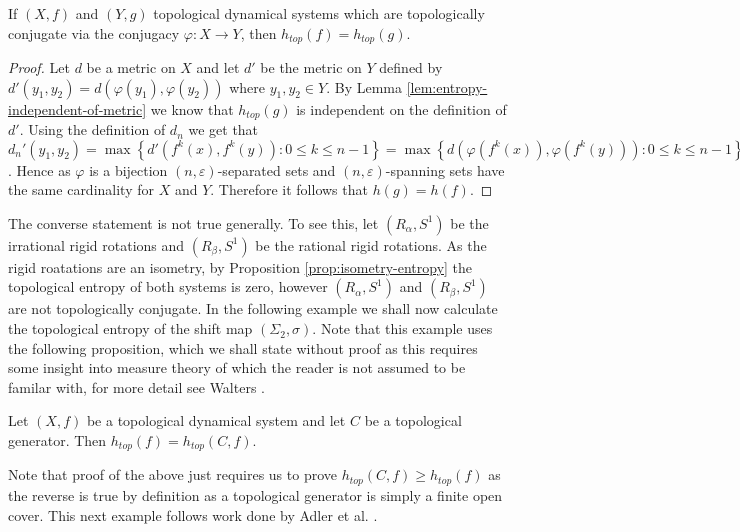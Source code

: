 \begin{prop} \label{prop:conjugacy-preserves-entropy}
    If $(X, f)$ and $(Y, g)$ topological dynamical systems which are topologically conjugate via the conjugacy $\varphi: X \to Y$, then $h_{top}(f) = h_{top}(g)$.
    \begin{proof}
    Let $d$ be a metric on $X$ and let $d'$ be the metric on $Y$ defined by $d'(y_1, y_2) = d(\varphi(y_1), \varphi(y_2))$ where $y_1, y_2 \in Y$. By Lemma \ref{lem:entropy-independent-of-metric} we know that $h_{top}(g)$ is independent on the definition of $d'$. Using the definition of $d_n$ we get that $d_n'(y_1, y_2) = \max{\left\lbrace d'(f^k(x), f^k(y)): 0 \leq k \leq n - 1 \right\rbrace} = \max{\left\lbrace d(\varphi(f^k(x)), \varphi(f^k(y))): 0 \leq k \leq n - 1 \right\rbrace} = \max{\left\lbrace d(f^k(\varphi(x)), f^k(\varphi(y))): 0 \leq k \leq n - 1 \right\rbrace}  = d_n(\varphi(y_1), \varphi(y_2))$. Hence as $\varphi$ is a bijection $(n, \varepsilon)$-separated sets and $(n, \varepsilon)$-spanning sets have the same cardinality for $X$ and $Y$. Therefore it follows that $h(g) = h(f)$.
    \end{proof}
\end{prop}

The converse statement is not true generally. To see this, let $(R_\alpha, S^1)$ be the irrational rigid rotations and $(R_\beta, S^1)$ be the rational rigid rotations. As the rigid roatations are an isometry, by Proposition \ref{prop:isometry-entropy} the topological entropy of both systems is zero, however $(R_\alpha, S^1)$ and $(R_\beta, S^1)$ are not topologically conjugate. In the following example we shall now calculate the topological entropy of the shift map $(\Sigma_2, \sigma)$. Note that this example uses the following proposition, which we shall state without proof as this requires some insight into measure theory of which the reader is not assumed to be familar with, for more detail see Walters \cite{walters}.

\begin{prop} \label{prop:entropy-generator}
    Let $(X, f)$ be a topological dynamical system and let $C$ be a topological generator. Then $h_{top}(f) = h_{top}(C, f)$.
\end{prop}

Note that proof of the above just requires us to prove $h_{top}(C, f) \geq h_{top}(f)$ as the reverse is true by definition as a topological generator is simply a finite open cover. This next example follows work done by Adler et al. \cite{adler}.


